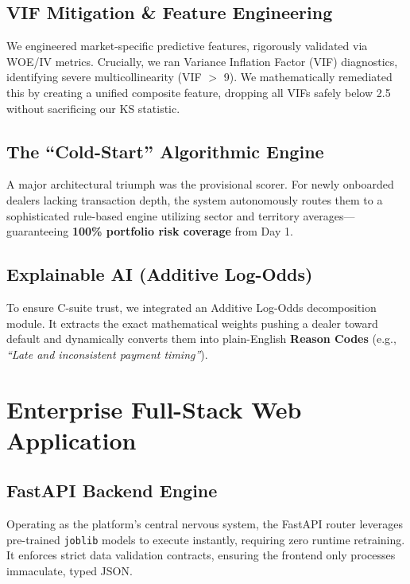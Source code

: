 \documentclass[11pt, a4paper]{article}
\begin{document}
\subsection{VIF Mitigation \& Feature Engineering}
We engineered market-specific predictive features, rigorously validated via WOE/IV metrics. Crucially, we ran Variance Inflation Factor (VIF) diagnostics, identifying severe multicollinearity (VIF $>$ 9). We mathematically remediated this by creating a unified composite feature, dropping all VIFs safely below 2.5 without sacrificing our KS statistic.

\subsection{The ``Cold-Start'' Algorithmic Engine}
A major architectural triumph was the provisional scorer. For newly onboarded dealers lacking transaction depth, the system autonomously routes them to a sophisticated rule-based engine utilizing sector and territory averages—guaranteeing \textbf{100\% portfolio risk coverage} from Day 1.

\subsection{Explainable AI (Additive Log-Odds)}
To ensure C-suite trust, we integrated an Additive Log-Odds decomposition module. It extracts the exact mathematical weights pushing a dealer toward default and dynamically converts them into plain-English \textbf{Reason Codes} (e.g., \textit{``Late and inconsistent payment timing''}).

\section{Enterprise Full-Stack Web Application}

\subsection{FastAPI Backend Engine}
Operating as the platform's central nervous system, the FastAPI router leverages pre-trained \texttt{joblib} models to execute instantly, requiring zero runtime retraining. It enforces strict data validation contracts, ensuring the frontend only processes immaculate, typed JSON.
\end{document}
